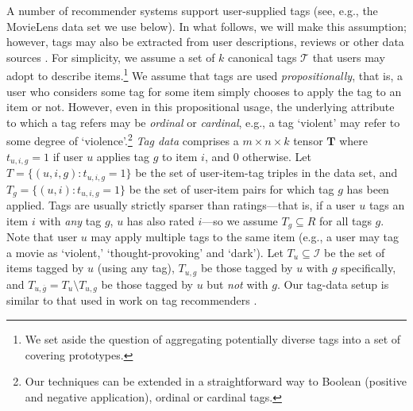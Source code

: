 \documentclass[manuscript,screen,nonacm]{acmart}
\newcommand{\1}{{\mathbf 1}}
\newcommand{\bfT}{\mathbf{T}}
\newcommand{\calI}{\mathcal{I}}
\newcommand{\calT}{\mathcal{T}}
\newcommand{\olg}{\overline{g}}
\theoremstyle{TheoremNum}
\begin{document}
A number of recommender systems support user-supplied tags (see, e.g., the MovieLens data set \cite{harper16:movielens} we use below). In what follows, we will make this assumption; however, tags may also be extracted from user descriptions, reviews or other data sources \cite{mining_reviews}. For simplicity, we assume a set of $k$ canonical tags $\calT$ that users may adopt to describe items.\footnote{We set aside the question of aggregating potentially diverse tags into a set of covering prototypes.}
We assume that tags are used \emph{propositionally}, that is, a user who considers some tag for some item simply chooses to apply the tag to an item or not. However, even in this propositional usage, the underlying attribute to which a tag refers may be \emph{ordinal} or \emph{cardinal}, e.g., a tag `violent' may refer to some degree of `violence'.\footnote{Our techniques can be extended in a straightforward way to Boolean (positive and negative application), ordinal or cardinal tags.} \emph{Tag data} comprises a $m\times n \times k$ tensor $\bfT$ where $t_{u,i,g} = 1$ if user $u$ applies tag $g$ to item $i$, and $0$ otherwise. Let $T = \{(u,i,g) : t_{u,i,g}\!=\! 1\}$ be the set of user-item-tag triples in the data set, and $T_g = \{(u,i) : t_{u,i,g}\!=\! 1\}$ be the set of user-item pairs for which tag $g$ has been applied. Tags are usually strictly sparser than ratings---that is, if a user $u$ tags an item $i$ with \emph{any} tag $g$, $u$ has also rated $i$---so we assume $T_g \subseteq R$ for all tags $g$. Note that user $u$ may apply multiple tags to the same item (e.g., a user may tag a movie as `violent,' `thought-provoking' and `dark'). Let $T_{u} \subseteq\calI$ be the set of items tagged by $u$ (using any tag), $T_{u,g}$ be those tagged by $u$ with $g$ specifically, and
$T_{u,\olg} = T_{u} \setminus T_{u,g}$ be those tagged by $u$ but \emph{not} with $g$. Our tag-data setup is similar to that used in work on tag recommenders \cite{gantner:icdm2010,cohen:recsys2017,luo2020latent}.
\end{document}
